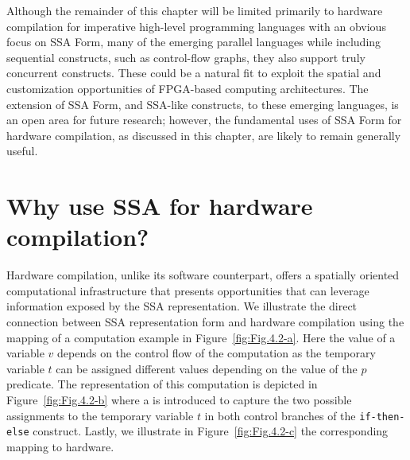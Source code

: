 Although the remainder of this chapter will be limited primarily to hardware compilation for imperative high-level programming languages with an obvious focus on SSA Form, many of the emerging parallel languages while including sequential constructs, such as control-flow graphs, they also support truly concurrent constructs. These could be a natural fit to exploit the spatial and customization opportunities of FPGA-based computing architectures.
%
The extension of SSA Form, and SSA-like constructs, to these emerging languages, is an open area for future research; however, the fundamental uses of SSA Form for hardware compilation, as discussed in this chapter, are likely to remain generally useful.

\section{Why use SSA for hardware compilation?}
Hardware compilation, unlike its software counterpart, offers a spatially oriented computational infrastructure that presents opportunities that can leverage information exposed by the SSA representation. 
We illustrate the direct connection between SSA representation form and hardware compilation using the mapping of a computation example in Figure~\ref{fig:Fig.4.2-a}. 
Here the value of a variable $v$ depends on the control flow of the computation as the temporary variable $t$ can be assigned different values depending on the value of the $p$ predicate. 
The representation of this computation is depicted in Figure~\ref{fig:Fig.4.2-b} where a \phifun is introduced to capture the two possible assignments to the temporary variable $t$ in both control branches of the {\tt if-then-else} construct. 
Lastly, we illustrate in Figure~\ref{fig:Fig.4.2-c} the corresponding mapping to hardware.

